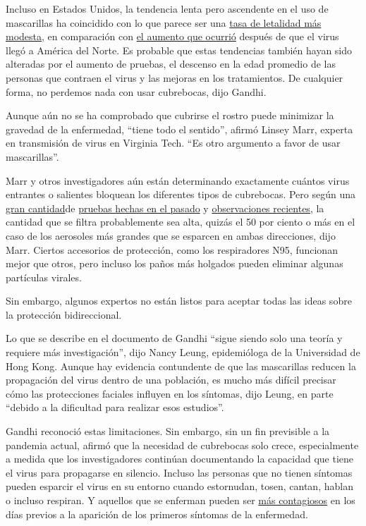 Incluso en Estados Unidos, la tendencia lenta pero ascendente en el uso
de mascarillas ha coincidido con lo que parece ser una
\href{https://www.nytimes.com/2020/07/03/health/coronavirus-mortality-testing.html}{tasa
de letalidad más modesta}, en comparación con
\href{https://www.nytimes.com/es/interactive/2020/espanol/mundo/coronavirus-en-estados-unidos.html}{el
aumento que ocurrió} después de que el virus llegó a América del Norte.
Es probable que estas tendencias también hayan sido alteradas por el
aumento de pruebas, el descenso en la edad promedio de las personas que
contraen el virus y las mejoras en los tratamientos. De cualquier forma,
no perdemos nada con usar cubrebocas, dijo Gandhi.

Aunque aún no se ha comprobado que cubrirse el rostro puede minimizar la
gravedad de la enfermedad, ``tiene todo el sentido'', afirmó Linsey
Marr, experta en transmisión de virus en Virginia Tech. ``Es otro
argumento a favor de usar mascarillas''.

Marr y otros investigadores aún están determinando exactamente cuántos
virus entrantes o salientes bloquean los diferentes tipos de cubrebocas.
Pero según una
\href{https://journals.plos.org/plosone/article?id=10.1371/journal.pone.0002618}{gran
cantidad}de
\href{https://www.nature.com/articles/s41591-020-0843-2}{pruebas hechas
en el pasado} y
\href{https://www.thelancet.com/journals/lancet/article/PIIS0140-6736(20)31142-9/fulltext\#\%20}{observaciones
recientes}, la cantidad que se filtra probablemente sea alta, quizás el
50 por ciento o más en el caso de los aerosoles más grandes que se
esparcen en ambas direcciones, dijo Marr. Ciertos accesorios de
protección, como los respiradores N95, funcionan mejor que otros, pero
incluso los paños más holgados pueden eliminar algunas partículas
virales.

Sin embargo, algunos expertos no están listos para aceptar todas las
ideas sobre la protección bidireccional.

Lo que se describe en el documento de Gandhi ``sigue siendo solo una
teoría y requiere más investigación'', dijo Nancy Leung, epidemióloga de
la Universidad de Hong Kong. Aunque hay evidencia contundente de que las
mascarillas reducen la propagación del virus dentro de una población, es
mucho más difícil precisar cómo las protecciones faciales influyen en
los síntomas, dijo Leung, en parte ``debido a la dificultad para
realizar esos estudios''.

Gandhi reconoció estas limitaciones. Sin embargo, sin un fin previsible
a la pandemia actual, afirmó que la necesidad de cubrebocas solo crece,
especialmente a medida que los investigadores continúan documentando la
capacidad que tiene el virus para propagarse en silencio. Incluso las
personas que no tienen síntomas pueden esparcir el virus en su entorno
cuando estornudan, tosen, cantan, hablan o incluso respiran. Y aquellos
que se enferman pueden ser
\href{https://www.nature.com/articles/s41591-020-0869-5}{más
contagiosos} en los días previos a la aparición de los primeros síntomas
de la enfermedad.

